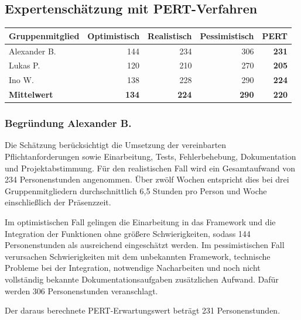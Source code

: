 \documentclass[a4paper,10pt]{article}
\begin{document}
        \subsection*{Expertenschätzung mit PERT-Verfahren}
        \par\noindent\begin{minipage}{\linewidth}
            \centering
            \begin{tabular}{lrrrr}
                \hline

                \textbf{Gruppenmitglied} & \textbf{Optimistisch} & \textbf{Realistisch} & \textbf{Pessimistisch} & \textbf{PERT} \\
                \hline

                Alexander B.             & 144                   & 234                  & 306                    & \textbf{231}  \\
                Lukas P.                 & 120                   & 210                  & 270                    & \textbf{205}  \\
                Ino W.                   & 138                   & 228                  & 290                    & \textbf{224}  \\
                \midrule
                \textbf{Mittelwert}      & \textbf{134}          & \textbf{224}         & \textbf{290}           & \textbf{220}  \\

            \end{tabular}
        \end{minipage}\par

        \par\noindent\begin{minipage}{\linewidth}
\subsubsection*{Begründung Alexander B.}
        Die Schätzung berücksichtigt die Umsetzung der vereinbarten Pflichtanforderungen sowie Einarbeitung, Tests, Fehlerbehebung, Dokumentation und Projektabstimmung. Für den realistischen Fall wird ein Gesamtaufwand von 234 Personenstunden angenommen. Über zwölf Wochen entspricht dies bei drei Gruppenmitgliedern durchschnittlich 6,5 Stunden pro Person und Woche einschlie\ss{}lich der Präsenzzeit.

    Im optimistischen Fall gelingen die Einarbeitung in das Framework und die Integration der Funktionen ohne grö\ss{}ere Schwierigkeiten, sodass 144 Personenstunden als ausreichend eingeschätzt werden. Im pessimistischen Fall verursachen Schwierigkeiten mit dem unbekannten Framework, technische Probleme bei der Integration, notwendige Nacharbeiten und noch nicht vollständig bekannte Dokumentationsaufgaben zusätzlichen Aufwand. Dafür werden 306 Personenstunden veranschlagt.

    Der daraus berechnete PERT-Erwartungswert beträgt 231 Personenstunden.

        
\end{minipage}\par
\end{document}
